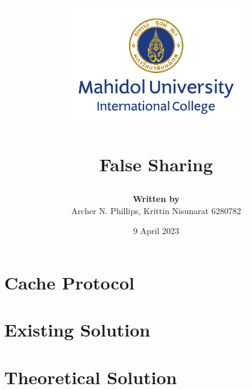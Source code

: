\documentclass[a4paper, 12pt]{report}
\title{

	{\includegraphics[width=80mm,scale=0.5]{MUIC_Logo_Eng_Center.png}} \\
	{\textbf{\mySubject}}\\
	{\large False Sharing}\\
}
\author{
	{\textbf{Written by}} \\ 
	{Archer N. Phillips, Krittin Nisunarat 6280782} \\
}
\date{9 April 2023}
\begin{document}
\maketitle
\begin{abstract}
	
\end{abstract}
\tableofcontents


\chapter{Cache Protocol}


\chapter{Existing Solution}



\chapter{Theoretical Solution}






\end{document}
